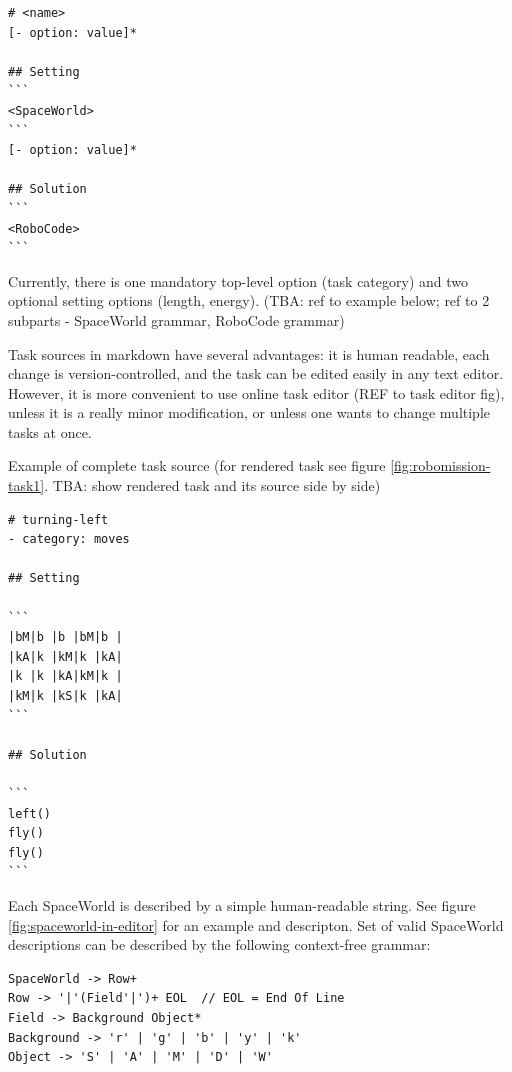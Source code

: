\begin{lstlisting}
# <name>
[- option: value]*

## Setting
```
<SpaceWorld>
```
[- option: value]*

## Solution
```
<RoboCode>
```
\end{lstlisting}

Currently, there is one mandatory top-level option (task category)
and two optional setting options (length, energy).
(TBA: ref to example below; ref to 2 subparts - SpaceWorld grammar, RoboCode grammar)

Task sources in markdown have several advantages:
it is human readable,
each change is version-controlled,
and the task can be edited easily in any text editor.
However, it is more convenient to use online task editor (REF to task editor fig),
unless it is a really minor modification, or unless one wants to change multiple tasks at once.



Example of complete task source (for rendered task see figure \ref{fig:robomission-task1}. TBA: show rendered task and its source side by side)

\begin{lstlisting}
# turning-left
- category: moves

## Setting

```
|bM|b |b |bM|b |
|kA|k |kM|k |kA|
|k |k |kA|kM|k |
|kM|k |kS|k |kA|
```

## Solution

```
left()
fly()
fly()
```
\end{lstlisting}



Each SpaceWorld is described by a simple human-readable string.
See figure \ref{fig:spaceworld-in-editor} for an example and descripton.
Set of valid SpaceWorld descriptions can be described by the
following context-free grammar:

\begin{lstlisting}
SpaceWorld -> Row+
Row -> '|'(Field'|')+ EOL  // EOL = End Of Line
Field -> Background Object*
Background -> 'r' | 'g' | 'b' | 'y' | 'k'
Object -> 'S' | 'A' | 'M' | 'D' | 'W'
\end{lstlisting}


